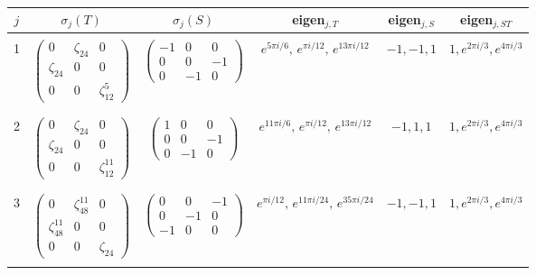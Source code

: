 \documentclass[11pt,reqno]{amsart}
\renewcommand{\arraystretch}{1.5}
\renewcommand{\arraystretch}{1.5}
\renewcommand{\=}{\;=\;}
\theoremstyle{myremark}
\begin{document}
\newcommand{\spacerrow}{\rule{0pt}{2ex} & & & & & \\}
\begin{table}[htbp]
\caption{}
\label{table}
\centering

{\scriptsize
\setlength{\tabcolsep}{4pt}
\renewcommand{\arraystretch}{1}

\begin{tabular}{|c|c|c|c|c|c|}
\hline
$j$ & $\sigma_j(T)$ & $\sigma_j(S)$ & eigen$_{j,T}$ & eigen$_{j,S}$ & eigen$_{j,ST}$ \\
\hline

\spacerrow
1 &
$\left(\begin{array}{ccc}
0 & \zeta_{24} & 0 \\
\zeta_{24} & 0 & 0 \\
0 & 0 & \zeta_{12}^{5}
\end{array}\right)$
&
$\left(\begin{array}{ccc}
-1 & 0 & 0 \\
0 & 0 & -1 \\
0 & -1 & 0
\end{array}\right)$
&
$e^{5\pi i/6},\,e^{\pi i/12},\,e^{13\pi i/12}$
&
$-1,-1,1$
&
$1,e^{2\pi i/3},e^{4\pi i/3}$
\\
\spacerrow
\hline

\spacerrow
2 &
$\left(\begin{array}{ccc}
0 & \zeta_{24} & 0 \\
\zeta_{24} & 0 & 0 \\
0 & 0 & \zeta_{12}^{11}
\end{array}\right)$
&
$\left(\begin{array}{ccc}
1 & 0 & 0 \\
0 & 0 & -1 \\
0 & -1 & 0
\end{array}\right)$
&
$e^{11\pi i/6},\,e^{\pi i/12},\,e^{13\pi i/12}$
&
$-1,1,1$
&
$1,e^{2\pi i/3},e^{4\pi i/3}$
\\
\spacerrow
\hline

\spacerrow
3 &
$\left(\begin{array}{ccc}
0 & \zeta_{48}^{11} & 0 \\
\zeta_{48}^{11} & 0 & 0 \\
0 & 0 & \zeta_{24}
\end{array}\right)$
&
$\left(\begin{array}{ccc}
0 & 0 & -1 \\
0 & -1 & 0 \\
-1 & 0 & 0
\end{array}\right)$
&
$e^{\pi i/12},\,e^{11\pi i/24},\,e^{35\pi i/24}$
&
$-1,-1,1$
&
$1,e^{2\pi i/3},e^{4\pi i/3}$
\\
\spacerrow
\hline


\end{tabular}}
\end{table}
\end{document}
